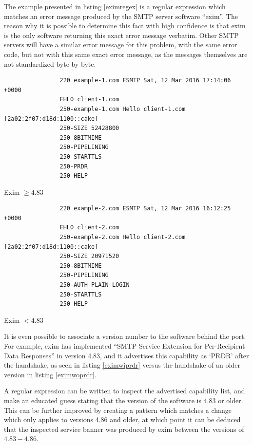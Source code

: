 \documentclass[a4paper,12pt]{article}
\begin{document}
	The example presented in listing \ref{eximregex} is a regular expression which matches an error message produced by the SMTP server software ``exim''. The reason why it is possible to determine this fact with high confidence is that exim is the only software returning this exact error message verbatim. Other SMTP servers will have a similar error message for this problem, with the same error code, but not with this same exact error message, as the messages themselves are not standardized byte-by-byte.
	
	\begin{multicols}{2}
		\begin{listing}[H]
			\begin{verbatim}
				220 example-1.com ESMTP Sat, 12 Mar 2016 17:14:06 +0000
				EHLO client-1.com
				250-example-1.com Hello client-1.com [2a02:2f07:d18d:1100::cake]
				250-SIZE 52428800
				250-8BITMIME
				250-PIPELINING
				250-STARTTLS
				250-PRDR
				250 HELP
			\end{verbatim}
			\caption{Exim $\ge 4.83$}
			\label{eximwiprdr}
		\end{listing}
		\begin{listing}[H]
			\begin{verbatim}
				220 example-2.com ESMTP Sat, 12 Mar 2016 16:12:25 +0000
				EHLO client-2.com
				250-example-2.com Hello client-2.com [2a02:2f07:d18d:1100::cake]
				250-SIZE 20971520
				250-8BITMIME
				250-PIPELINING
				250-AUTH PLAIN LOGIN
				250-STARTTLS
				250 HELP
			\end{verbatim}
			\caption{Exim $< 4.83$}
			\label{eximwoprdr}
		\end{listing}
	\end{multicols}
	
	It is even possible to associate a version number to the software behind the port. For example, exim has implemented ``SMTP Service Extension for Per-Recipient Data Responses'' in version 4.83, and it advertises this capability as `PRDR' after the handshake, as seen in listing \ref{eximwiprdr} versus the handshake of an older version in listing \ref{eximwoprdr}.
	
	A regular expression can be written to inspect the advertised capability list, and make an educated guess stating that the version of the software is 4.83 or older. This can be further improved by creating a pattern which matches a change which only applies to versions 4.86 and older, at which point it can be deduced that the inspected service banner was produced by exim between the versions of $4.83-4.86$.
	
\end{document}
